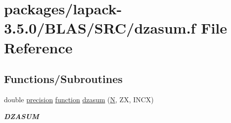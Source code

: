 \hypertarget{lapack-3_85_80_2BLAS_2SRC_2dzasum_8f}{}\section{packages/lapack-\/3.5.0/\+B\+L\+A\+S/\+S\+R\+C/dzasum.f File Reference}
\label{lapack-3_85_80_2BLAS_2SRC_2dzasum_8f}
\subsection*{Functions/\+Subroutines}
\begin{DoxyCompactItemize}
\item 
double \hyperlink{numinquire_8h_a2c8e616467665d0b2814d4c1589ba74e}{precision} \hyperlink{afunc_8m_a7b5e596df91eadea6c537c0825e894a7}{function} \hyperlink{group__double__blas__level1_ga60d5c8001b317c929778670a15013eb4}{dzasum} (\hyperlink{polmisc_8c_a0240ac851181b84ac374872dc5434ee4}{N}, Z\+X, I\+N\+C\+X)
\begin{DoxyCompactList}\small\item\em {\bfseries D\+Z\+A\+S\+U\+M} \end{DoxyCompactList}\end{DoxyCompactItemize}

